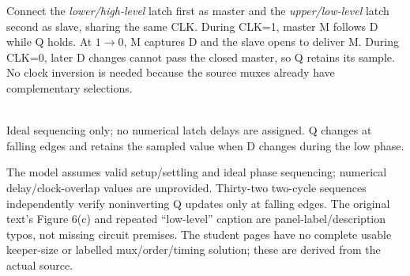 \documentclass[10pt]{article}
\begin{document}
Connect the \emph{lower/high-level} latch first as master and the \emph{upper/low-level} latch second as slave, sharing the same CLK. During CLK=1, master M follows D while Q holds. At $1\to0$, M captures D and the slave opens to deliver M. During CLK=0, later D changes cannot pass the closed master, so Q retains its sample. No clock inversion is needed because the source muxes already have complementary selections.
\begin{center}\end{center}
\begin{center}\\Ideal sequencing only; no numerical latch delays are assigned. Q changes at falling edges and retains the sampled value when D changes during the low phase.\end{center}
The model assumes valid setup/settling and ideal phase sequencing; numerical delay/clock-overlap values are unprovided. Thirty-two two-cycle sequences independently verify noninverting Q updates only at falling edges. The original text's Figure 6(c) and repeated ``low-level'' caption are panel-label/description typos, not missing circuit premises. The student pages have no complete usable keeper-size or labelled mux/order/timing solution; these are derived from the actual source.
\end{document}
